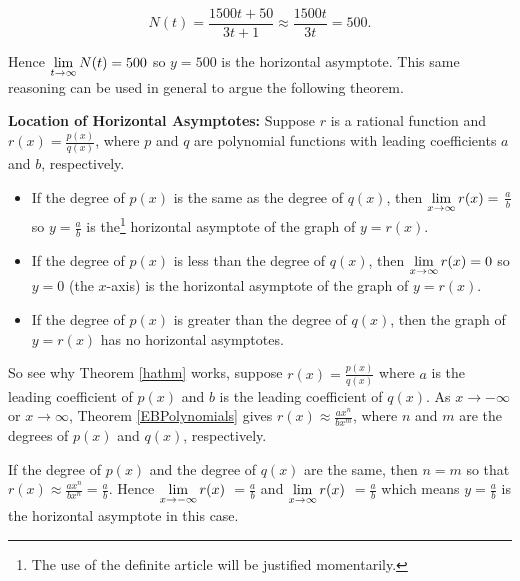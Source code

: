  \[ N(t) = \dfrac{1500t + 50}{3t+1} \approx \dfrac{1500t}{3t} = 500.\]
 
Hence $\ds{\lim_{t \rightarrow  \infty} N(t) = 500}$ so  $y = 500$ is the horizontal asymptote.  This same reasoning can be used in general to argue the following theorem.

\smallskip
\colorbox{ResultColor}{\bbm

\begin{thm} \textbf{Location of Horizontal Asymptotes:}\label{hathm} Suppose $r$ is a rational function and $r(x) = \frac{p(x)}{q(x)}$, where $p$ and $q$ are polynomial functions with leading coefficients $a$ and $b$, respectively. 

\begin{itemize}

\item  If the degree of $p(x)$ is the same as the degree of $q(x)$, then $\ds{\lim_{x \rightarrow \infty} r(x) =}$ $\frac{a}{b}$ so $y=\frac{a}{b}$ is the\footnote{The use of the definite article will be justified momentarily.} horizontal asymptote of the graph of $y=r(x)$.

\item  If the degree of $p(x)$ is less than the degree of $q(x)$, then $\ds{\lim_{x \rightarrow \infty} r(x) =0}$  so $y=0$ (the $x$-axis) is the horizontal asymptote of the graph of $y=r(x)$.

\item  If the degree of $p(x)$ is greater than the degree of $q(x)$, then the graph of $y=r(x)$ has no horizontal asymptotes.


\end{itemize}
\end{thm}
\ebm}
\smallskip



So see why Theorem \ref{hathm} works, suppose $r(x) = \frac{p(x)}{q(x)}$ where $a$ is the leading coefficient of $p(x)$ and $b$ is the leading coefficient of $q(x)$. As $x \rightarrow  -\infty$ or $x \rightarrow \infty$,  Theorem \ref{EBPolynomials} gives $r(x) \approx \frac{ax^n}{bx^m}$, where $n$ and $m$ are the degrees of $p(x)$ and $q(x)$, respectively. 

If the degree of $p(x)$ and the degree of $q(x)$ are the same, then $n=m$ so that $r(x) \approx \frac{ax^n}{bx^n} = \frac{a}{b}$.  Hence $\ds{\lim_{x \rightarrow  -\infty} r(x)}$ $=\frac{a}{b}$  and $\ds{\lim_{x \rightarrow  \infty} r(x)}$ $=\frac{a}{b}$ which means $y=\frac{a}{b}$ is the horizontal asymptote in this case.  

